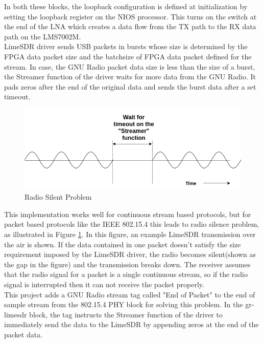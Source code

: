 In both these blocks, the loopback configuration is defined at initialization by setting the loopback register on the NIOS processor.
This turns on the switch at the end of the \ac{LNA} which creates a data flow from the TX path to the RX data path on the LMS7002M.\\


LimeSDR driver sends USB packets in bursts whose size is determined by the FPGA data packet size and the batchsize of FPGA data packet defined for the stream.
In case, the GNU Radio packet data size is less than the size of a burst, the Streamer function of the driver waits for more data from the GNU Radio.
It pads zeros after the end of the original data and sends the burst data after a set timeout.\\

\begin{figure}[h!]
\centering
\includegraphics[scale=0.6]{Thesis/Figure/SilentProblem.png}
\caption{Radio Silent Problem}
\label{Radio_Silent}
\end{figure}

This implementation works well for continuous stream based protocols, but for packet based protocols like the IEEE 802.15.4 this leads to radio silence problem, as illustrated in Figure \ref{Radio_Silent}.
In this figure, an example LimeSDR transmission over the air is shown.
If the data contained in one packet doesn't satisfy the size requirement imposed by the LimeSDR driver, the radio becomes silent(shown as the gap in the figure) and the transmission breaks down.
The receiver assumes that the radio signal for a packet is a single continuous stream, so if the radio signal is interrupted then it can not receive the packet properly.\\

This project adds a GNU Radio stream tag called "End of Packet" to the end of sample stream from the 802.15.4 PHY block for solving this problem.
In the gr-limesdr block, the tag instructs the Streamer function of the driver to immediately send the data to the LimeSDR by appending zeros at the end of the packet data.


